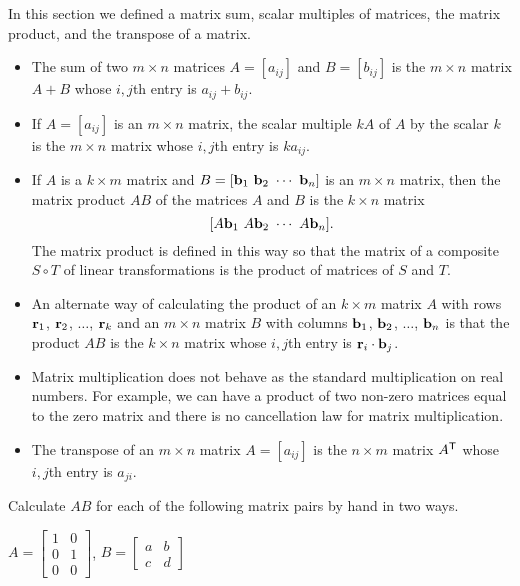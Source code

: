In this section we defined a matrix sum, scalar multiples of matrices, the matrix product, and the transpose of a matrix.
\begin{itemize}
\item The sum of two $m \times n$ matrices $A = [a_{ij}]$ and $B = [b_{ij}]$ is the $m \times n$ matrix $A+B$ whose $i,j$th entry is $a_{ij} + b_{ij}$.
\item If  $A = [a_{ij}]$ is an $m \times n$ matrix, the scalar multiple $kA$ of $A$ by the scalar $k$ is the $m \times n$ matrix whose $i,j$th entry is $ka_{ij}$.
\item If $A$ is a $k \times m$ matrix and $B = [\vb_1 \ \vb_2 \ \cdots \ \vb_n]$ is an $m \times n$ matrix, then the matrix product $AB$ of the matrices $A$ and $B$ is the $k \times n$ matrix
\[[A\vb_1 \ A\vb_2 \ \cdots \ A\vb_n].\]
The matrix product is defined in this way so that the matrix of a composite $S \circ T$ of linear transformations is the product of matrices of $S$ and $T$.
\item An alternate way of calculating the product of an $k \times m$ matrix $A$ with rows $\mathbf{r}_1$, $\mathbf{r}_2$, $\ldots$, $\mathbf{r}_k$  and an $m \times n$ matrix $B$ with columns $\mathbf{b}_1$, $\mathbf{b}_2$, $\ldots$, $\mathbf{b}_n$ is that the product $AB$ is the $k \times n$ matrix whose $i,j$th entry is $\mathbf{r}_i \cdot \mathbf{b}_j$. 
\item Matrix multiplication does not behave as the standard multiplication on real numbers. For example, we can have a product of two non-zero matrices equal to the zero matrix and there is no cancellation law for matrix multiplication.
\item The transpose of an $m \times n$ matrix $A = [a_{ij}]$ is the $n \times m$ matrix $A^{\mathsf{T}}$ whose $i,j$th entry is $a_{ji}$.
\end{itemize}




\label{sec:mtx_ops_exer}

\be
\item Calculate $AB$ for each of the following matrix pairs by hand in two ways.

\ba
\item $A = \left[ \begin{array}{cc} 1&0\\0&1\\0&0 \end{array} \right]$, $B = \left[ \begin{array}{cc} a&b \\ c&d \end{array} \right]$

